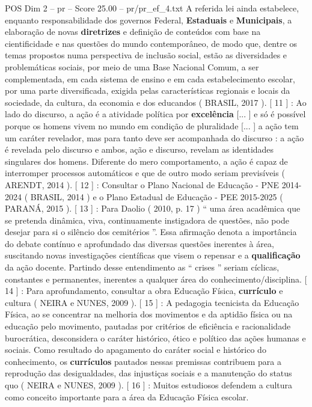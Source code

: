 \begin{textsample}{POS Dim 2 – pr – Score 25.00 – pr/pr\_ef\_4.txt}
A referida lei ainda estabelece, enquanto responsabilidade dos governos Federal, \textbf{Estaduais} e \textbf{Municipais}, a elaboração de novas \textbf{diretrizes} e definição de conteúdos com base na cientificidade e nas questões do mundo contemporâneo, de modo que, dentre os temas propostos numa perspectiva de inclusão social, estão as diversidades e problemáticas sociais, por meio de uma Base Nacional Comum, a ser complementada, em cada sistema de ensino e em cada estabelecimento escolar, por uma parte diversificada, exigida pelas características regionais e locais da sociedade, da cultura, da economia e dos educandos ( BRASIL, 2017 ). [ 11 ] : Ao lado do discurso, a ação é a atividade política por \textbf{excelência} [... ] e só é possível porque os homens vivem no mundo em condição de pluralidade [... ] a ação tem um caráter revelador, mas para tanto deve ser acompanhada do discurso : a ação é revelada pelo discurso e ambos, ação e discurso, revelam as identidades singulares dos homens.
Diferente do mero comportamento, a ação é capaz de interromper processos automáticos e que de outro modo seriam previsíveis ( ARENDT, 2014 ). [ 12 ] : Consultar o Plano Nacional de Educação - PNE 2014-2024 ( BRASIL, 2014 ) e o Plano Estadual de Educação - PEE 2015-2025 ( PARANÁ, 2015 ). [ 13 ] : Para Daolio ( 2010, p. 17 ) “ uma área acadêmica que se pretenda dinâmica, viva, continuamente instigadora de questões, não pode desejar para si o silêncio dos cemitérios ”.
Essa afirmação denota a importância do debate contínuo e aprofundado das diversas questões inerentes à área, suscitando novas investigações científicas que visem o repensar e a \textbf{qualificação} da ação docente.
Partindo desse entendimento as “ crises ” seriam cíclicas, constantes e permanentes, inerentes a qualquer área do conhecimento/disciplina. [ 14 ] : Para aprofundamento, consultar a obra Educação Física, \textbf{currículo} e cultura ( NEIRA e NUNES, 2009 ). [ 15 ] : A pedagogia tecnicista da Educação Física, ao se concentrar na melhoria dos movimentos e da aptidão física ou na educação pelo movimento, pautadas por critérios de eficiência e racionalidade burocrática, desconsidera o caráter histórico, ético e político das ações humanas e sociais.
Como resultado do apagamento do caráter social e histórico do conhecimento, os \textbf{currículos} pautados nessas premissas contribuem para a reprodução das desigualdades, das injustiças sociais e a manutenção do status quo ( NEIRA e NUNES, 2009 ). [ 16 ] : Muitos estudiosos defendem a cultura como conceito importante para a área da Educação Física escolar.

\end{textsample}
